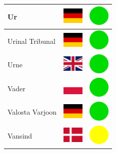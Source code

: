 \documentclass[12pt, a4paper, twoside]{report}
\begin{document}
\begin{center}
\begin{longtable}{|p{5cm}|p{2cm}|p{2cm}|}
 Ur                                                         & \includegraphics[width=1cm]{../4x3/de} &   \includegraphics[width=1cm]{../likes/y} \\ \hline
 Urinal Tribunal                                            & \includegraphics[width=1cm]{../4x3/de} &   \includegraphics[width=1cm]{../likes/y} \\ \hline
 Urne                                                       & \includegraphics[width=1cm]{../4x3/gb} &   \includegraphics[width=1cm]{../likes/y} \\ \hline
 Vader                                                      & \includegraphics[width=1cm]{../4x3/pl} &   \includegraphics[width=1cm]{../likes/y} \\ \hline
 Valosta Varjoon                                            & \includegraphics[width=1cm]{../4x3/de} &   \includegraphics[width=1cm]{../likes/y} \\ \hline
 Vansind                                                    & \includegraphics[width=1cm]{../4x3/dk} &   \includegraphics[width=1cm]{../likes/m} \\ \hline

\end{longtable}
\end{center}
\end{document}
